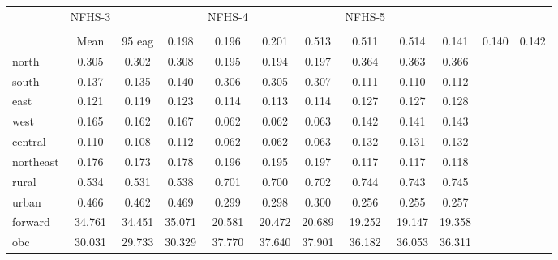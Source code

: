 {
\def\sym#1{\ifmmode^{#1}\else\(^{#1}\)\fi}
\begin{tabular}{l*{3}{ccc}}
\hline\hline
                    &      NFHS-3&            &            &      NFHS-4&            &            &      NFHS-5&            &            \\
                    &                  &                  &                  \\
                    &        Mean&95%
\hline
eag                 &       0.198&       0.196&       0.201&       0.513&       0.511&       0.514&       0.141&       0.140&       0.142\\
north               &       0.305&       0.302&       0.308&       0.195&       0.194&       0.197&       0.364&       0.363&       0.366\\
south               &       0.137&       0.135&       0.140&       0.306&       0.305&       0.307&       0.111&       0.110&       0.112\\
east                &       0.121&       0.119&       0.123&       0.114&       0.113&       0.114&       0.127&       0.127&       0.128\\
west                &       0.165&       0.162&       0.167&       0.062&       0.062&       0.063&       0.142&       0.141&       0.143\\
central             &       0.110&       0.108&       0.112&       0.062&       0.062&       0.063&       0.132&       0.131&       0.132\\
northeast           &       0.176&       0.173&       0.178&       0.196&       0.195&       0.197&       0.117&       0.117&       0.118\\
rural               &       0.534&       0.531&       0.538&       0.701&       0.700&       0.702&       0.744&       0.743&       0.745\\
urban               &       0.466&       0.462&       0.469&       0.299&       0.298&       0.300&       0.256&       0.255&       0.257\\
forward             &      34.761&      34.451&      35.071&      20.581&      20.472&      20.689&      19.252&      19.147&      19.358\\
obc                 &      30.031&      29.733&      30.329&      37.770&      37.640&      37.901&      36.182&      36.053&      36.311\\

\end{tabular}}

